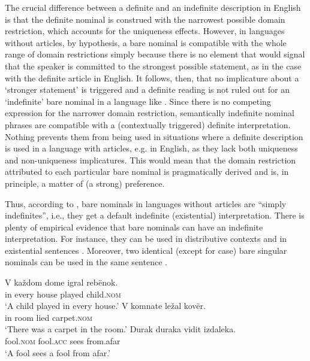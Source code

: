 \documentclass[output=paper]{langscibook}
\begin{document}
The crucial difference between a definite and an indefinite description in English is that the definite nominal is construed with the narrowest possible domain restriction, which accounts for the uniqueness effects. However, in languages without articles, by hypothesis, a bare nominal is compatible with the whole range of domain restrictions simply because there is no element that would signal that the speaker is committed to the strongest possible statement, as in the case with the definite article in English. It follows, then, that no implicature about a `stronger statement' is triggered and a definite reading is not ruled out for an `indefinite' bare nominal in a language like . Since there is no competing expression for the narrower domain restriction, semantically indefinite nominal phrases are compatible with a (contextually triggered) definite interpretation. Nothing prevents them from being used in situations where a definite description is used in a language with articles, e.g. in English, as they lack both uniqueness and non-uniqueness implicatures. This would mean that the domain restriction attributed to each particular bare nominal is pragmatically derived and is, in principle, a matter of (a strong) preference.

Thus, according to \citet[1006]{Heim2011}, bare nominals in languages without articles are ``simply indefinites'', i.e., they get a default indefinite (existential) interpretation. There is plenty of empirical evidence that
 bare nominals can have an indefinite interpretation. For instance, they can be used in distributive contexts  and in existential sentences . Moreover, two identical (except for case) bare singular nominals can be used in the same sentence .

\ea \label{ex:seres:28}
\gll	V	každom	dome		igral		rebënok. \\
	   	in	every		house	played	child.\textsc{nom}\\
	\glt `A child played in every house.'
\z
\ea \label{ex:seres:29}
\gll	V	komnate	ležal	kovër. \\
in 	room 		lied 	carpet.\textsc{nom}\\
\glt`There was a carpet in the room.'
\z
\ea \label{ex:seres:30}
\gll	Durak		duraka	vidit	izdaleka. \\
fool.\textsc{nom} 	fool.\textsc{acc} 	sees 	from.afar\\
\glt `A fool sees a fool from afar.'
\z
\end{document}
